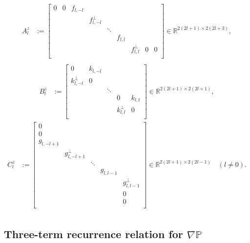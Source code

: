 \documentclass[11pt, oneside]{article}   	%
\newcommand{\R}{\mathbb{R}}
\newcommand{\gradP}{\nabla\mathbb{P}}
\begin{document}
\begin{align}
A^z_l &:= \begin{bmatrix}
		0 & 0 & f_{l,-l} \\
		& & & f^\perp_{l,-l} \\
		& & & & \ddots \\
		& & & & & f_{l,l} \\
		& & & & & & f^\perp_{l,l} & 0 & 0 \\
	    \end{bmatrix} \in \R^{2(2l+1)\times2(2l+3)}, \\
\end{align}
\begin{align}
B^z_l &:= \begin{bmatrix}
		0 & k_{l,-l} \\
		k^\perp_{l,-l} & 0 \\
		& & \ddots \\
		& & & 0 & k_{l,l} \\
		& & & k^\perp_{l,l} & 0 \\
	\end{bmatrix}  \in \R^{2(2l+1)\times2(2l+1)}, 
\end{align}
\begin{align}
C^z_l &:= \begin{bmatrix}
		0 \\
		0 \\
		g_{l,-l+1} \\
		& g^\perp_{l,-l+1} \\
		& & \ddots \\
		& & & g_{l,l-1} \\
		& & & & g^\perp_{l,l-1} \\
		& & & & 0 \\
		& & & & 0 \\
	    \end{bmatrix} \in \R^{2(2l+1)\times2(2l-1)} \quad (l \ne 0). \\
\end{align}



\subsection{Three-term recurrence relation for \(\gradP\)}
\end{document}
